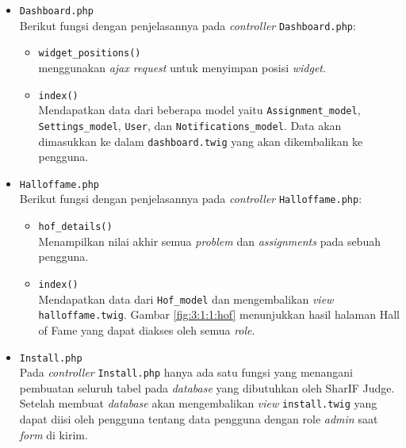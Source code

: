\begin{itemize}
\begin{itemize}
	\item \verb|Dashboard.php| \\
	      Berikut fungsi dengan penjelasannya pada \textit{controller} \verb|Dashboard.php|:

	      \begin{itemize}
		      \item \verb|widget_positions()| \\
		            menggunakan \textit{ajax request} untuk menyimpan posisi \textit{widget}.

		      \item \verb|index()| \\
		            Mendapatkan data dari beberapa model yaitu \verb|Assignment_model|, \verb|Settings_model|, \verb|User|, dan \verb|Notifications_model|. Data akan dimasukkan ke dalam \verb|dashboard.twig| yang akan dikembalikan ke pengguna. 

		           

	      \end{itemize}

	\item \verb|Halloffame.php| \\
	      Berikut fungsi dengan penjelasannya pada \textit{controller} \verb|Halloffame.php|:

	      \begin{itemize}
		      \item \verb|hof_details()| \\
		            Menampilkan nilai akhir semua \textit{problem} dan \textit{assignments} pada sebuah pengguna.

		      \item \verb|index()| \\
		            Mendapatkan data dari \verb|Hof_model| dan mengembalikan \textit{view} \verb|halloffame.twig|. Gambar \ref{fig:3:1:1:hof} menunjukkan hasil halaman Hall of Fame yang dapat diakses oleh semua \textit{role}.
	      \end{itemize}

	\item \verb|Install.php| \\
	      Pada \textit{controller} \verb|Install.php| hanya ada satu fungsi yang menangani pembuatan seluruh tabel pada \textit{database} yang dibutuhkan oleh SharIF Judge. Setelah membuat \textit{database} akan mengembalikan \textit{view} \verb|install.twig| yang dapat diisi oleh pengguna tentang data pengguna dengan role \textit{admin} saat \textit{form} di kirim. 


\end{itemize}
\end{itemize}
